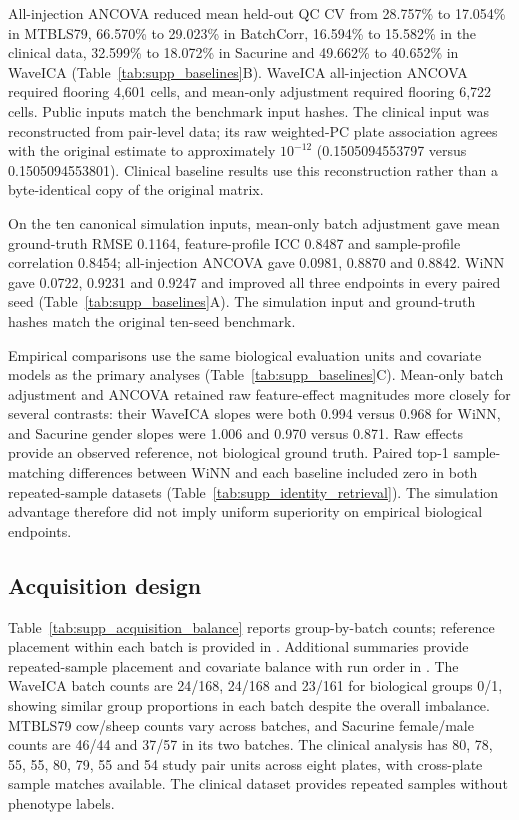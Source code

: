 \documentclass[namedate,webpdf,modern,large,nocrop]{oup-authoring-template}
\begin{document}
All-injection ANCOVA reduced mean held-out QC CV from 28.757\% to 17.054\% in MTBLS79, 66.570\% to 29.023\% in BatchCorr, 16.594\% to 15.582\% in the clinical data, 32.599\% to 18.072\% in Sacurine and 49.662\% to 40.652\% in WaveICA (Table~\ref{tab:supp_baselines}B). WaveICA all-injection ANCOVA required flooring 4,601 cells, and mean-only adjustment required flooring 6,722 cells. Public inputs match the benchmark input hashes. The clinical input was reconstructed from pair-level data; its raw weighted-PC plate association agrees with the original estimate to approximately $10^{-12}$ (0.1505094553797 versus 0.1505094553801). Clinical baseline results use this reconstruction rather than a byte-identical copy of the original matrix.

On the ten canonical simulation inputs, mean-only batch adjustment gave mean ground-truth RMSE 0.1164, feature-profile ICC 0.8487 and sample-profile correlation 0.8454; all-injection ANCOVA gave 0.0981, 0.8870 and 0.8842. WiNN gave 0.0722, 0.9231 and 0.9247 and improved all three endpoints in every paired seed (Table~\ref{tab:supp_baselines}A). The simulation input and ground-truth hashes match the original ten-seed benchmark.

Empirical comparisons use the same biological evaluation units and covariate models as the primary analyses (Table~\ref{tab:supp_baselines}C). Mean-only batch adjustment and ANCOVA retained raw feature-effect magnitudes more closely for several contrasts: their WaveICA slopes were both 0.994 versus 0.968 for WiNN, and Sacurine gender slopes were 1.006 and 0.970 versus 0.871. Raw effects provide an observed reference, not biological ground truth. Paired top-1 sample-matching differences between WiNN and each baseline included zero in both repeated-sample datasets (Table~\ref{tab:supp_identity_retrieval}). The simulation advantage therefore did not imply uniform superiority on empirical biological endpoints.

\subsection{Acquisition design}

Table~\ref{tab:supp_acquisition_balance} reports group-by-batch counts; reference placement within each batch is provided in . Additional summaries provide repeated-sample placement and covariate balance with run order in . The WaveICA batch counts are 24/168, 24/168 and 23/161 for biological groups 0/1, showing similar group proportions in each batch despite the overall imbalance. MTBLS79 cow/sheep counts vary across batches, and Sacurine female/male counts are 46/44 and 37/57 in its two batches. The clinical analysis has 80, 78, 55, 55, 80, 79, 55 and 54 study pair units across eight plates, with cross-plate sample matches available. The clinical dataset provides repeated samples without phenotype labels.
\end{document}
